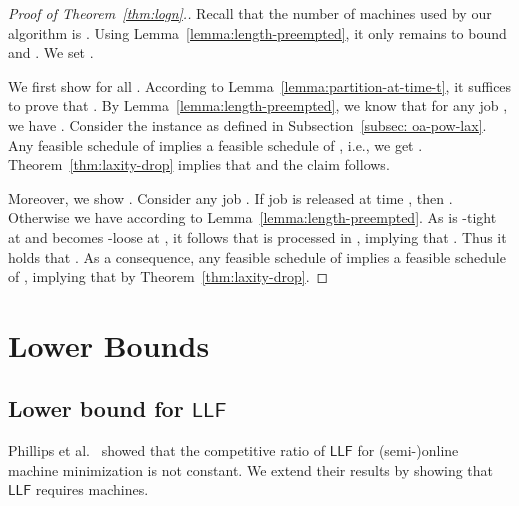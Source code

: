 \documentclass[letterpaper,11pt]{article}
\newcommand{\LLF}{\ensuremath{\mathsf{LLF}}\xspace}
\begin{document}
\begin{proof}[Proof of Theorem~\ref{thm:logn}.]
Recall that the number of machines used by our algorithm is . Using Lemma~\ref{lemma:length-preempted}, it only remains to bound  and . We set . 

We first show  for all . According to Lemma~\ref{lemma:partition-at-time-t}, it suffices to prove that . By Lemma~\ref{lemma:length-preempted}, we know that for any job , we have . Consider the instance  as defined in Subsection~\ref{subsec: oa-pow-lax}. Any feasible schedule of  implies a feasible schedule of , i.e., we get . Theorem~\ref{thm:laxity-drop} implies that  and the claim follows.

Moreover, we show . Consider any job . If job  is released at time , then . Otherwise  we have  according to Lemma~\ref{lemma:length-preempted}. As  is -tight at  and becomes -loose at , it follows that  is processed in , implying that . Thus it holds that . As a consequence, any feasible schedule of  implies a feasible schedule of , implying that  by Theorem~\ref{thm:laxity-drop}.
\end{proof}





\section{Lower Bounds}
\label{sec:LB}

\subsection{Lower bound for \LLF}

Phillips et al.~\cite{phillipsSTW02} showed that the competitive ratio of \LLF for (semi-)online machine minimization is not constant. We extend their results by showing that \LLF requires  machines.
\end{document}
